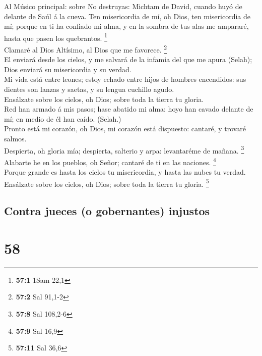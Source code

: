  Al Músico principal: sobre No destruyas: Michtam de David,
cuando huyó de delante de Saúl á la cueva. Ten misericordia de mí, oh
Dios, ten misericordia de mí; porque en ti ha confiado mi alma, y en la
sombra de tus alas me ampararé, hasta que pasen los quebrantos.
\footnote{\textbf{57:1} 1Sam 22,1}\\
 Clamaré al Dios Altísimo, al Dios que me favorece.
\footnote{\textbf{57:2} Sal 91,1-2}\\
 El enviará desde los cielos, y me salvará de la infamia del
que me apura (Selah); Dios enviará su misericordia y su verdad.\\
 Mi vida está entre leones; estoy echado entre hijos de
hombres encendidos: sus dientes son lanzas y saetas, y su lengua
cuchillo agudo.\\
 Ensálzate sobre los cielos, oh Dios; sobre toda la tierra
tu gloria.\\
 Red han armado á mis pasos; hase abatido mi alma: hoyo han
cavado delante de mí; en medio de él han caído. (Selah.)\\
 Pronto está mi corazón, oh Dios, mi corazón está dispuesto:
cantaré, y trovaré salmos.\\
 Despierta, oh gloria mía; despierta, salterio y arpa:
levantaréme de mañana. \footnote{\textbf{57:8} Sal 108,2-6}\\
 Alabarte he en los pueblos, oh Señor; cantaré de ti en las
naciones. \footnote{\textbf{57:9} Sal 16,9}\\
 Porque grande es hasta los cielos tu misericordia, y hasta
las nubes tu verdad.\\
 Ensálzate sobre los cielos, oh Dios; sobre toda la tierra
tu gloria. \footnote{\textbf{57:11} Sal 36,6}

\hypertarget{contra-jueces-o-gobernantes-injustos}{%
\subsection{Contra jueces (o gobernantes)
injustos}\label{contra-jueces-o-gobernantes-injustos}}

\hypertarget{section-57}{%
\section{58}\label{section-57}}

